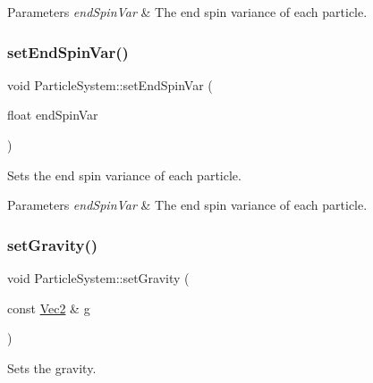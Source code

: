 \begin{DoxyParams}{Parameters}
{\em end\+Spin\+Var} & The end spin variance of each particle. \\
\hline
\end{DoxyParams}
\mbox{\label{classParticleSystem_a27c18cce7626182bc71b523f607587d5}} 
\subsubsection{\texorpdfstring{set\+End\+Spin\+Var()}{setEndSpinVar()}\hspace{0.1cm}{\footnotesize\ttfamily [2/2]}}
{\footnotesize\ttfamily void Particle\+System\+::set\+End\+Spin\+Var (\begin{DoxyParamCaption}\item[{float}]{end\+Spin\+Var }\end{DoxyParamCaption})\hspace{0.3cm}{\ttfamily [inline]}}

Sets the end spin variance of each particle.


\begin{DoxyParams}{Parameters}
{\em end\+Spin\+Var} & The end spin variance of each particle. \\
\hline
\end{DoxyParams}
\mbox{\label{classParticleSystem_a0a54c75d4db91c5b6ab880c28b8461f2}} 
\subsubsection{\texorpdfstring{set\+Gravity()}{setGravity()}\hspace{0.1cm}{\footnotesize\ttfamily [1/2]}}
{\footnotesize\ttfamily void Particle\+System\+::set\+Gravity (\begin{DoxyParamCaption}\item[{const \hyperlink{classVec2}{Vec2} \&}]{g }\end{DoxyParamCaption})\hspace{0.3cm}{\ttfamily [virtual]}}

Sets the gravity.


